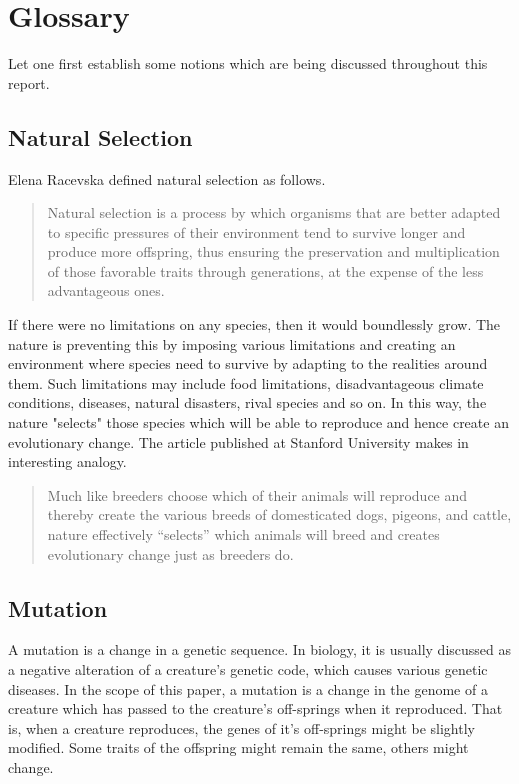 \documentclass{article}
\begin{document}
\section{Glossary}

Let one first establish some notions which are being discussed throughout this report.

\subsection{Natural Selection}

Elena Racevska defined natural selection as follows.

\begin{quotation}
    Natural selection is a process by which organisms that are better adapted to specific pressures of their environment tend to survive longer and produce more offspring, thus ensuring the preservation and multiplication of those favorable traits through generations, at the expense of the less advantageous ones.
\end{quotation}

If there were no limitations on any species, then it would boundlessly grow. The nature is preventing this by imposing various limitations and creating an environment where species need to survive by adapting to the realities around them. Such limitations may include food limitations, disadvantageous climate conditions, diseases, natural disasters, rival species and so on. In this way, the nature "selects" those species which will be able to reproduce and hence create an evolutionary change. The article published at Stanford University makes in interesting analogy. 

\begin{quotation}
    Much like breeders choose which of their animals will reproduce and thereby create the various breeds of domesticated dogs, pigeons, and cattle, nature effectively “selects” which animals will breed and creates evolutionary change just as breeders do.
\end{quotation}

\subsection{Mutation}

A mutation is a change in a genetic sequence. In biology, it is usually discussed as a negative alteration of a creature's genetic code, which causes various genetic diseases. In the scope of this paper, a mutation is a change in the genome of a creature which has passed to the creature's off-springs when it reproduced. That is, when a creature reproduces, the genes of it's off-springs might be slightly modified. Some traits of the offspring might remain the same, others might change.
\end{document}
